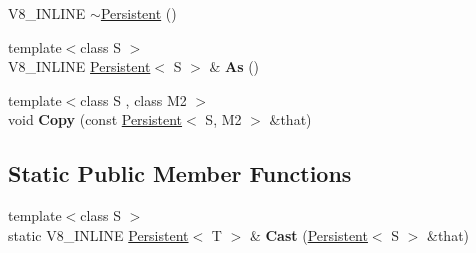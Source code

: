 \begin{DoxyCompactItemize}
\item 
V8\+\_\+\+I\+N\+L\+I\+N\+E \hyperlink{classv8_1_1Persistent_a7d4d2bebfe3919e447e22adc15464e25}{$\sim$\+Persistent} ()
\item 
\hypertarget{classv8_1_1Persistent_a8d2c96e559ac88f6201d98cb2a626808}{}{\footnotesize template$<$class S $>$ }\\V8\+\_\+\+I\+N\+L\+I\+N\+E \hyperlink{classv8_1_1Persistent}{Persistent}$<$ S $>$ \& {\bfseries As} ()\label{classv8_1_1Persistent_a8d2c96e559ac88f6201d98cb2a626808}

\item 
\hypertarget{classv8_1_1Persistent_ace50a178e3b772f75611e22e41fae974}{}{\footnotesize template$<$class S , class M2 $>$ }\\void {\bfseries Copy} (const \hyperlink{classv8_1_1Persistent}{Persistent}$<$ S, M2 $>$ \&that)\label{classv8_1_1Persistent_ace50a178e3b772f75611e22e41fae974}

\end{DoxyCompactItemize}
\subsection*{Static Public Member Functions}
\begin{DoxyCompactItemize}
\item 
\hypertarget{classv8_1_1Persistent_aa20fd9af0b410df9e887689ef97c28dd}{}{\footnotesize template$<$class S $>$ }\\static V8\+\_\+\+I\+N\+L\+I\+N\+E \hyperlink{classv8_1_1Persistent}{Persistent}$<$ T $>$ \& {\bfseries Cast} (\hyperlink{classv8_1_1Persistent}{Persistent}$<$ S $>$ \&that)\label{classv8_1_1Persistent_aa20fd9af0b410df9e887689ef97c28dd}

\end{DoxyCompactItemize}
